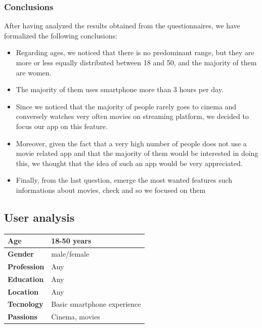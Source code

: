\documentclass[12pt, a4paper]{article}
\begin{document}
\subsubsection{Conclusions}
After having analyzed the results obtained from the questionnaires, we have formalized the following conclusions:
\begin{itemize}
\setlength\itemsep{0.01em}
	\item Regarding ages, we noticed that there is no predominant range, but they are more or less equally distributed between 18 and 50, and the majority of them are women.
	\item The majority of them uses smartphone more than 3 hours per day.
	\item Since we noticed that the majority of people rarely goes to cinema and conversely watches very often movies on streaming platform, we decided to focus our app on this feature. 
	\item Moreover, given the fact that a very high number of people does not use a movie related app and that the majority of them would be interested in doing this, we thought that the idea of such an app would be very appreciated.
	\item Finally, from the last question, emerge the most wanted features such informations about movies, check and so we focused on them
\end{itemize}


\subsection{User analysis}

\begin{center}
	\begin{tabular}{ |p{3cm}|P{7cm}|  }
		\hline
		\textbf{Age}			& 	18-50 years  				\\
		\hline
		\textbf{Gender}			& 	male/female					\\
		\hline
		\textbf{Profession} 	&	Any							\\
		\hline
		\textbf{Education} 	 	&	Any							\\
		\hline
		\textbf{Location}		&	Any							\\
		\hline
		\textbf{Tecnology}		&	Basic smartphone experience	\\
		\hline
		\textbf{Passions}		&	Cinema, movies				\\
		\hline
	\end{tabular}
\end{center}
\end{document}
